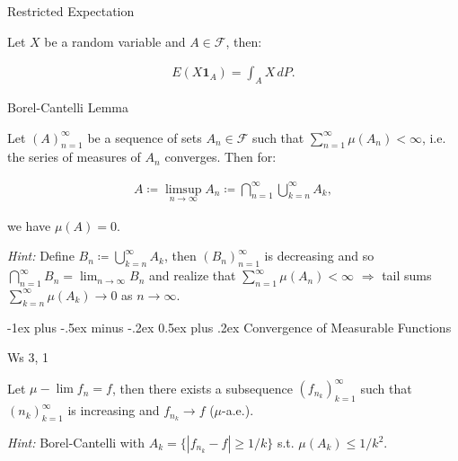 \documentclass[10pt,landscape]{article}
\makeatletter
\renewcommand{\leq}{\leqslant}
\renewcommand{\geq}{\geqslant}
\newcommand{\Hint}{\textit{Hint: }}
\newcommand{\Indicator}[1]{\mathbf{1}_{#1}}
\newcommand{\CalF}{\mathcal{F}}
\renewcommand{\section}{\@startsection{section}{1}{0mm}%
                                {-1ex plus -.5ex minus -.2ex}%
                                {0.5ex plus .2ex}%
                                {\normalfont\large\bfseries}}
\makeatother
\begin{document}
\begin{multicols}{3}
\begin{proposition}{}{Restricted Expectation}

    Let $X$ be a random variable and $A \in \CalF$, then:

        \begin{align*}
            E(X \Indicator{A}) = \int_A X \,dP.
        \end{align*}

\end{proposition}

\begin{lemma}{4.4}{Borel-Cantelli Lemma}

    Let $(A)_{n=1}^{\infty}$ be a sequence of sets $A_n \in \CalF$ such that $\sum_{n=1}^{\infty} \mu(A_n) < \infty$, i.e. the series of measures of $A_n$ converges. Then for:

        \begin{align*}
            A \coloneqq \limsup_{n \to \infty} A_n \coloneqq \bigcap_{n=1}^{\infty} \bigcup_{k=n}^{\infty} A_k,
        \end{align*}

    we have $\mu(A) = 0$.

    \Hint Define $B_n \coloneqq \bigcup_{k=n}^{\infty} A_k$, then $(B_n)_{n=1}^\infty$ is decreasing and so $\bigcap_{n=1}^{\infty} B_n = \lim_{n \to \infty} B_n$ and realize that $\sum_{n=1}^{\infty} \mu(A_n) < \infty$ $\Rightarrow$ tail sums $\sum_{k=n}^{\infty} \mu(A_k) \to 0$ as $n \to \infty$.

\end{lemma}


\section{Convergence of Measurable Functions}

\begin{exercise}{Ws 3, 1}{}

    Let $\mu-\lim f_n = f$, then there exists a subsequence $(f_{n_k})_{k=1}^{\infty}$ such that $(n_k)_{k=1}^{\infty}$ is increasing and $f_{n_k} \to f$ ($\mu$-a.e.).

    \Hint Borel-Cantelli with $A_k = \{ |f_{n_k} - f| \geq 1/k \}$ s.t. $\mu(A_k) \leq 1/k^2$.

\end{exercise}


\end{multicols}
\end{document}
